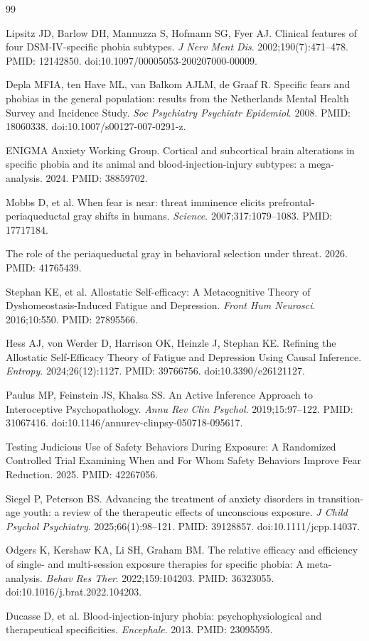 \documentclass[10pt]{article}
\begin{document}
\begin{thebibliography}{99}

Lipsitz JD, Barlow DH, Mannuzza S, Hofmann SG, Fyer AJ. Clinical features of four DSM-IV-specific phobia subtypes. \emph{J Nerv Ment Dis}. 2002;190(7):471--478. PMID: 12142850. doi:10.1097/00005053-200207000-00009.

Depla MFIA, ten Have ML, van Balkom AJLM, de Graaf R. Specific fears and phobias in the general population: results from the Netherlands Mental Health Survey and Incidence Study. \emph{Soc Psychiatry Psychiatr Epidemiol}. 2008. PMID: 18060338. doi:10.1007/s00127-007-0291-z.

ENIGMA Anxiety Working Group. Cortical and subcortical brain alterations in specific phobia and its animal and blood-injection-injury subtypes: a mega-analysis. 2024. PMID: 38859702.

Mobbs D, et al. When fear is near: threat imminence elicits prefrontal-periaqueductal gray shifts in humans. \emph{Science}. 2007;317:1079--1083. PMID: 17717184.

The role of the periaqueductal gray in behavioral selection under threat. 2026. PMID: 41765439.

Stephan KE, et al. Allostatic Self-efficacy: A Metacognitive Theory of Dyshomeostasis-Induced Fatigue and Depression. \emph{Front Hum Neurosci}. 2016;10:550. PMID: 27895566.

Hess AJ, von Werder D, Harrison OK, Heinzle J, Stephan KE. Refining the Allostatic Self-Efficacy Theory of Fatigue and Depression Using Causal Inference. \emph{Entropy}. 2024;26(12):1127. PMID: 39766756. doi:10.3390/e26121127.

Paulus MP, Feinstein JS, Khalsa SS. An Active Inference Approach to Interoceptive Psychopathology. \emph{Annu Rev Clin Psychol}. 2019;15:97--122. PMID: 31067416. doi:10.1146/annurev-clinpsy-050718-095617.

Testing Judicious Use of Safety Behaviors During Exposure: A Randomized Controlled Trial Examining When and For Whom Safety Behaviors Improve Fear Reduction. 2025. PMID: 42267056.

Siegel P, Peterson BS. Advancing the treatment of anxiety disorders in transition-age youth: a review of the therapeutic effects of unconscious exposure. \emph{J Child Psychol Psychiatry}. 2025;66(1):98--121. PMID: 39128857. doi:10.1111/jcpp.14037.

Odgers K, Kershaw KA, Li SH, Graham BM. The relative efficacy and efficiency of single- and multi-session exposure therapies for specific phobia: A meta-analysis. \emph{Behav Res Ther}. 2022;159:104203. PMID: 36323055. doi:10.1016/j.brat.2022.104203.

Ducasse D, et al. Blood-injection-injury phobia: psychophysiological and therapeutical specificities. \emph{Encephale}. 2013. PMID: 23095595.

\end{thebibliography}
\end{document}
